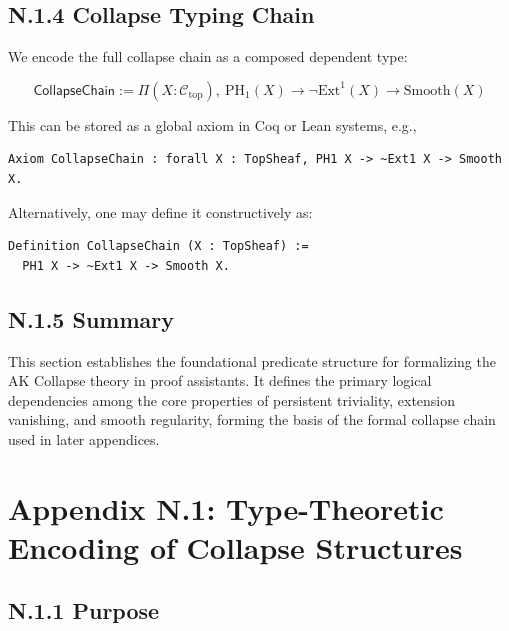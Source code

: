 \documentclass[11pt]{article}
\begin{document}
\subsection*{N.1.4 Collapse Typing Chain}

We encode the full collapse chain as a composed dependent type:

\[
\textsf{CollapseChain} :=
\Pi (X : \mathcal{C}_{\mathrm{top}}),\ 
\mathrm{PH}_1(X) \rightarrow \neg \mathrm{Ext}^1(X) \rightarrow \mathrm{Smooth}(X)
\]

This can be stored as a global axiom in Coq or Lean systems, e.g.,

\begin{verbatim}
Axiom CollapseChain : forall X : TopSheaf, PH1 X -> ~Ext1 X -> Smooth X.
\end{verbatim}

Alternatively, one may define it constructively as:

\begin{verbatim}
Definition CollapseChain (X : TopSheaf) :=
  PH1 X -> ~Ext1 X -> Smooth X.
\end{verbatim}

\subsection*{N.1.5 Summary}

This section establishes the foundational predicate structure for formalizing the AK Collapse theory in proof assistants.  
It defines the primary logical dependencies among the core properties of persistent triviality, extension vanishing,  
and smooth regularity, forming the basis of the formal collapse chain used in later appendices.




\section*{Appendix N.1: Type-Theoretic Encoding of Collapse Structures}

\subsection*{N.1.1 Purpose}
\end{document}

